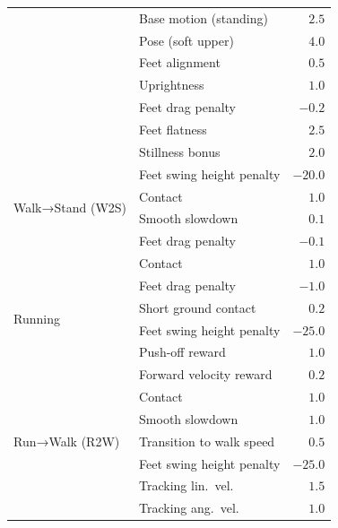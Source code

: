 \documentclass[letterpaper, 10 pt, conference]{ieeeconf}
\begin{document}
\begin{table}[h]
\begin{tabular}{llr}
& Base motion (standing) & $2.5$ \\
& Pose (soft upper) & $4.0$ \\
& Feet alignment & $0.5$ \\
& Uprightness & $1.0$ \\
& Feet drag penalty & $-0.2$ \\
& Feet flatness & $2.5$ \\
& Stillness bonus & $2.0$ \\
\midrule
\multirow{4}{*}{Walk→Stand (W2S)} 
& Feet swing height penalty & $-20.0$ \\
& Contact & $1.0$ \\
& Smooth slowdown & $0.1$ \\
& Feet drag penalty & $-0.1$ \\
\midrule
\multirow{6}{*}{Running} 
& Contact & $1.0$ \\
& Feet drag penalty & $-1.0$ \\
& Short ground contact & $0.2$ \\
& Feet swing height penalty & $-25.0$ \\
& Push-off reward & $1.0$ \\
& Forward velocity reward & $0.2$ \\
\midrule
\multirow{5}{*}{Run→Walk (R2W)} 
& Contact & $1.0$ \\
& Smooth slowdown & $1.0$ \\
& Transition to walk speed & $0.5$ \\
& Feet swing height penalty & $-25.0$ \\
\midrule
\multirow{2}{*}{Task rewards} 
& Tracking lin.\ vel. & $1.5$ \\
& Tracking ang.\ vel. & $1.0$ \\
\bottomrule
\end{tabular}
\end{table}
\end{document}
